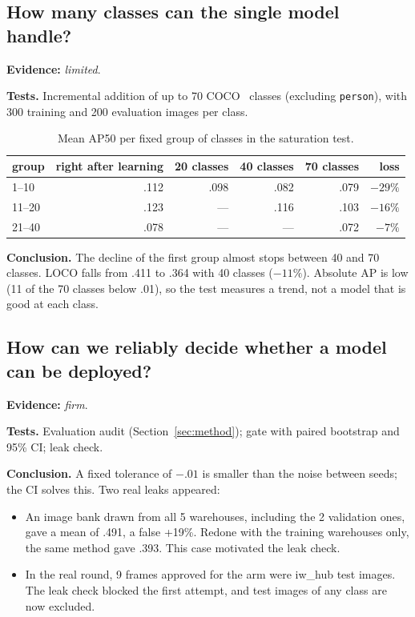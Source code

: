 \documentclass[11pt,a4paper]{article}
\newcommand{\evidence}[1]{\noindent\textbf{Evidence:} \emph{#1}.\par}
\newcommand{\tests}{\noindent\textbf{Tests.} }
\newcommand{\conclusion}{\noindent\textbf{Conclusion.} }
\begin{document}
\subsection{How many classes can the single model handle?}
\evidence{limited}

\tests Incremental addition of up to 70 COCO~\cite{coco} classes (excluding
\texttt{person}), with 300 training and 200 evaluation images per class.

\begin{table}[H]
\centering\small
\caption{Mean AP50 per fixed group of classes in the saturation test.}
\begin{tabular}{lrrrrr}
\toprule
group & right after learning & 20 classes & 40 classes & 70 classes & loss \\
\midrule
1--10 & .112 & .098 & .082 & .079 & $-29\%$ \\
11--20 & .123 & --- & .116 & .103 & $-16\%$ \\
21--40 & .078 & --- & --- & .072 & $-7\%$ \\
\bottomrule
\end{tabular}
\end{table}

\conclusion The decline of the first group almost stops between 40 and 70 classes.
LOCO falls from .411 to .364 with 40 classes ($-11\%$). Absolute AP is low (11 of
the 70 classes below .01), so the test measures a trend, not a model that is good
at each class.

\subsection{How can we reliably decide whether a model can be deployed?}
\evidence{firm}

\tests Evaluation audit (Section~\ref{sec:method}); gate with paired bootstrap and
95\% CI; leak check.

\conclusion A fixed tolerance of $-.01$ is smaller than the noise between seeds; the
CI solves this. Two real leaks appeared:
\begin{itemize}
  \item An image bank drawn from all 5 warehouses, including the 2 validation ones,
    gave a mean of .491, a false +19\%. Redone with the training warehouses only,
    the same method gave .393. This case motivated the leak check.
  \item In the real round, 9 frames approved for the arm were iw\_hub test images.
    The leak check blocked the first attempt, and test images of any class are now
    excluded.
\end{itemize}
\end{document}
